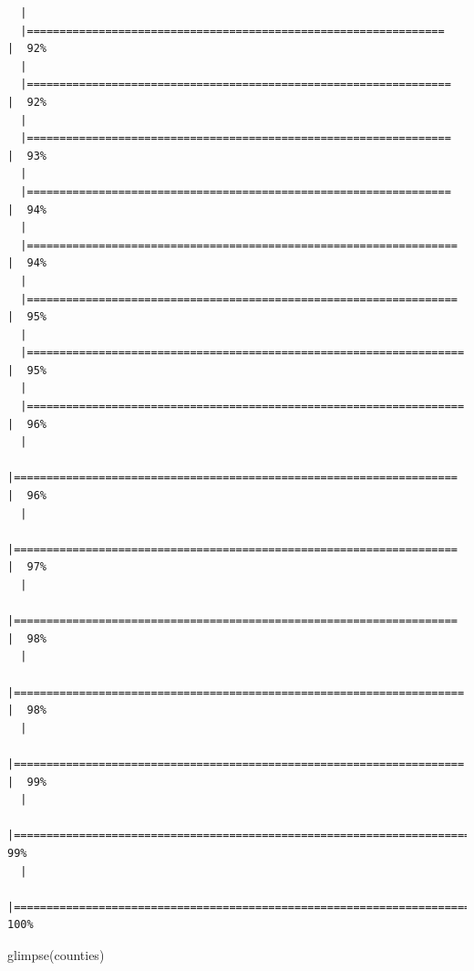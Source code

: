 \documentclass[
  letterpaper,
  DIV=11,
  numbers=noendperiod]{scrreprt}
\newenvironment{Shaded}{\begin{snugshade}}{\end{snugshade}}
\newcommand{\FunctionTok}[1]{\textcolor[rgb]{0.28,0.35,0.67}{#1}}
\newcommand{\NormalTok}[1]{\textcolor[rgb]{0.00,0.23,0.31}{#1}}
\begin{document}
\begin{verbatim}
  |                                                                            
  |================================================================      |  92%
  |                                                                            
  |=================================================================     |  92%
  |                                                                            
  |=================================================================     |  93%
  |                                                                            
  |=================================================================     |  94%
  |                                                                            
  |==================================================================    |  94%
  |                                                                            
  |==================================================================    |  95%
  |                                                                            
  |===================================================================   |  95%
  |                                                                            
  |===================================================================   |  96%
  |                                                                            
  |====================================================================  |  96%
  |                                                                            
  |====================================================================  |  97%
  |                                                                            
  |====================================================================  |  98%
  |                                                                            
  |===================================================================== |  98%
  |                                                                            
  |===================================================================== |  99%
  |                                                                            
  |======================================================================|  99%
  |                                                                            
  |======================================================================| 100%
\end{verbatim}

\begin{Shaded}
\begin{Highlighting}[]
\FunctionTok{glimpse}\NormalTok{(counties)}
\end{Highlighting}
\end{Shaded}
\end{document}
